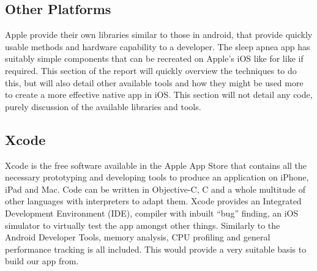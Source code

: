 \subsection{Other Platforms}
Apple provide their own libraries similar to those in android, that provide quickly usable methods and hardware capability to a developer. The sleep apnea app has suitably simple components that can be recreated on Apple’s iOS like for like if required. This section of the report will quickly overview the techniques to do this, but will also detail other available tools and how they might be used more to create a more effective native app in iOS. This section will not detail any code, purely discussion of the available libraries and tools.
\subsection{Xcode}
Xcode is the free software available in the Apple App Store that contains all the necessary prototyping and developing tools to produce an application on iPhone, iPad and Mac. Code can be written in Objective-C, C and a whole multitude of other languages with interpreters to adapt them. Xcode provides an Integrated Development Environment (IDE), compiler with inbuilt ``bug'' finding, an iOS simulator to virtually test the app amongst other things. Similarly to the Android Developer Tools, memory analysis, CPU profiling and general performance tracking is all included. This would provide a very suitable basis to build our app from.
